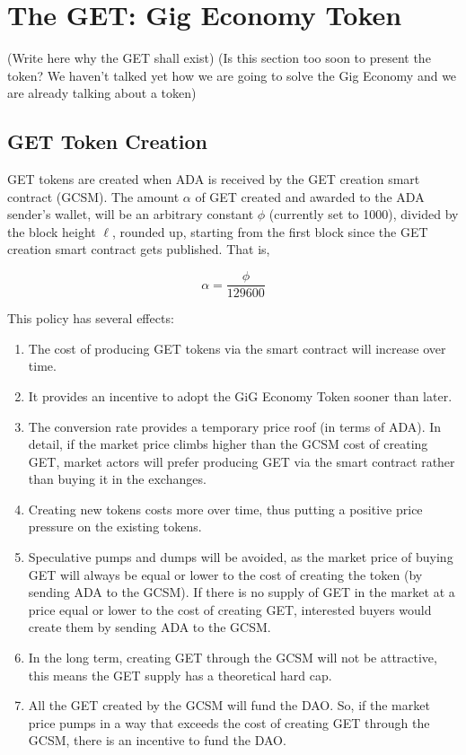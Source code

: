 \documentclass{article}
\begin{document}
\section{The GET: Gig Economy Token}

(Write here why the GET shall exist)
(Is this section too soon to present the token? We haven't talked yet how we are going to solve the Gig Economy and we are already talking about a token)

\subsection{GET Token Creation}
GET tokens are created when ADA is received by the GET creation smart contract (GCSM).
The amount $\alpha$ of GET created and awarded to the ADA sender's wallet, will be an arbitrary constant $\phi$ (currently set to 1000), divided by the block height $\ell$, rounded up, starting from the first block since the GET creation smart contract gets published. That is,

\[ \alpha
  = \dfrac{\phi}{129600}
\]

This policy has several effects:

\begin{enumerate}

  \item The cost of producing GET tokens via the smart contract will increase over time. 
  \item It provides an incentive to adopt the GiG Economy Token sooner than later. 
  \item The conversion rate provides a temporary price roof (in terms of ADA). In detail, if the market price climbs higher than the GCSM cost of creating GET, market actors will prefer producing GET via the smart contract rather than buying it in the exchanges.
  \item Creating new tokens costs more over time, thus putting a positive price pressure on the existing tokens.
  \item Speculative pumps and dumps will be avoided, as the market price of buying GET will always be equal or lower to the cost of creating the token (by sending ADA to the GCSM). If there is no supply of GET in the market at a price equal or lower to the cost of creating GET, interested buyers would create them by sending ADA to the GCSM. 
  \item In the long term, creating GET through the GCSM will not be attractive, this means the GET supply has a theoretical hard cap.
  \item All the GET created by the GCSM will fund the DAO. So, if the market price pumps in a way that exceeds the cost of creating GET through the GCSM, there is an incentive to fund the DAO.
\end{enumerate}
\end{document}
